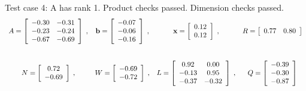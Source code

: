 {Test case 4: A has rank 1. Product checks passed. Dimension checks passed.
\[
\begin{array}{*{4}{c}}
A = \left[\begin{array}{*{2}c}
	-0.30 & -0.31\\
	-0.23 & -0.24\\
	-0.67 & -0.69
\end{array}\right]
\;, & 
\mathbf{b} = \left[\begin{array}{*{1}c}
	-0.07\\
	-0.06\\
	-0.16
\end{array}\right]
\;, & 
\mathbf{x} = \left[\begin{array}{*{1}c}
	0.12\\
	0.12
\end{array}\right]
\;, & 
R = \left[\begin{array}{*{2}c}
	0.77 & 0.80
\end{array}\right]
\\
\\\mbox{}\\
N = \left[\begin{array}{*{1}c}
	0.72\\
	-0.69
\end{array}\right]
\;, & 
W = \left[\begin{array}{*{1}c}
	-0.69\\
	-0.72
\end{array}\right]
\;, & 
L = \left[\begin{array}{*{2}c}
	0.92 & 0.00\\
	-0.13 & 0.95\\
	-0.37 & -0.32
\end{array}\right]
\;, & 
Q = \left[\begin{array}{*{1}c}
	-0.39\\
	-0.30\\
	-0.87
\end{array}\right]
\\
\end{array}
\]
\hrulefill

}
